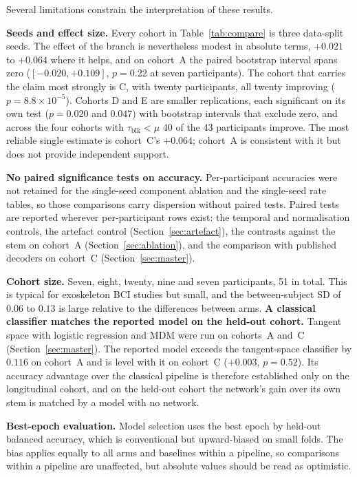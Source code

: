 \documentclass[a4paper,fleqn]{cas-dc}
\begin{document}
Several limitations constrain the interpretation of these results.

\textbf{Seeds and effect size.} Every cohort in Table~\ref{tab:compare} is three data-split seeds. The effect of the branch is nevertheless modest in absolute terms, $+0.021$ to $+0.064$ where it helps, and on cohort~A the paired bootstrap interval spans zero ($[-0.020, +0.109]$, $p=0.22$ at seven participants). The cohort that carries the claim most strongly is C, with twenty participants, all twenty improving ($p=8.8\times10^{-5}$). Cohorts D and E are smaller replications, each significant on its own test ($p=0.020$ and $0.047$) with bootstrap intervals that exclude zero, and across the four cohorts with $\tau_{\mathrm{blk}}<\mu$ 40 of the 43 participants improve. The most reliable single estimate is cohort~C's $+0.064$; cohort~A is consistent with it but does not provide independent support.

\textbf{No paired significance tests on accuracy.} Per-participant accuracies were not retained for the single-seed component ablation and the single-seed rate tables, so those comparisons carry dispersion without paired tests. Paired tests are reported wherever per-participant rows exist: the temporal and normalisation controls, the artefact control (Section~\ref{sec:artefact}), the contrasts against the stem on cohort~A (Section~\ref{sec:ablation}),
and the comparison with published decoders on cohort~C (Section~\ref{sec:master}).

\textbf{Cohort size.} Seven, eight, twenty, nine and seven participants, 51 in total. This is typical for
exoskeleton BCI studies \citep{he_exo} but small, and the between-subject SD of
$0.06$ to $0.13$ is large relative to the differences
between arms. \textbf{A classical classifier matches the reported model on the held-out cohort.} Tangent space with logistic regression and MDM were run on cohorts~A and~C (Section~\ref{sec:master}). The reported model exceeds the tangent-space classifier by $0.116$ on cohort~A and is level with it on cohort~C ($+0.003$, $p=0.52$). Its accuracy advantage over the classical pipeline is therefore established only on the longitudinal cohort, and on the held-out cohort the network's gain over its own stem is matched by a model with no network.

\textbf{Best-epoch evaluation.} Model selection uses the best epoch by held-out
balanced accuracy, which is conventional but upward-biased on small folds. The
bias applies equally to all arms and baselines within a pipeline, so comparisons
within a pipeline are unaffected, but absolute values should be read as
optimistic.
\end{document}
